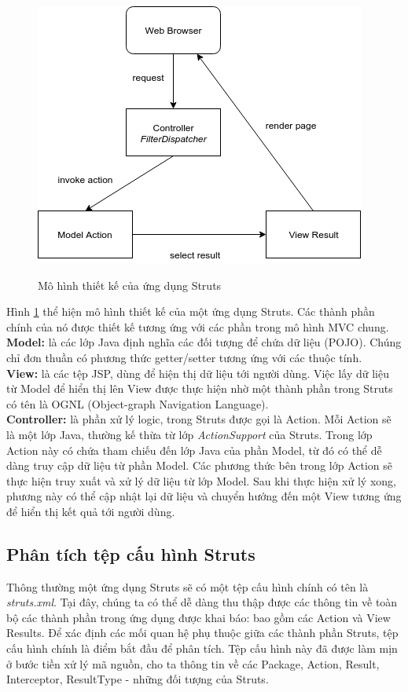 \documentclass[12pt,a4paper]{report}
\begin{document}
\begin{figure}[h]
	\centering
	\includegraphics[scale=0.8]{struts-architecture}
	\label{fig:struts-architecture}
	\caption{Mô hình thiết kế của ứng dụng Struts}
\end{figure}

Hình \ref{fig:struts-architecture} thể hiện mô hình thiết kế của một ứng dụng Struts. Các thành phần chính của nó được thiết kế tương ứng với các phần trong mô hình MVC chung.\\

\textbf{Model:} là các lớp Java định nghĩa các đối tượng để chứa dữ liệu (POJO). Chúng chỉ đơn thuần có phương thức getter/setter tương ứng với các thuộc tính.\\

\textbf{View:} là các tệp JSP, dùng để hiện thị dữ liệu tới người dùng. Việc lấy dữ liệu từ Model để hiển thị lên View được thực hiện nhờ một thành phần trong Struts có tên là OGNL (Object-graph Navigation Language).\\

\textbf{Controller:} là phần xử lý logic, trong Struts được gọi là Action. Mỗi Action sẽ là một lớp Java, thường kế thừa từ lớp \textit{ActionSupport} của Struts. Trong lớp Action này có chứa tham chiếu đến lớp Java của phần Model, từ đó có thể dễ dàng truy cập dữ liệu từ phần Model. Các phương thức bên trong lớp Action sẽ thực hiện truy xuất và xử lý dữ liệu từ lớp Model. Sau khi thực hiện xử lý xong, phương này có thể cập nhật lại dữ liệu và chuyển hướng đến một View tương ứng để hiển thị kết quả tới người dùng.\\

\subsection{Phân tích tệp cấu hình Struts}
Thông thường một ứng dụng Struts sẽ có một tệp cấu hình chính có tên là \textit{struts.xml}. Tại đây, chúng ta có thể dễ dàng thu thập được các thông tin về toàn bộ các thành phần trong ứng dụng được khai báo: bao gồm các Action và View Results. Để xác định các mối quan hệ phụ thuộc giữa các thành phần Struts, tệp cấu hình chính là điểm bắt đầu để phân tích. Tệp cấu hình này đã được làm mịn ở bước tiền xử lý mã nguồn, cho ta thông tin về các Package, Action, Result, Interceptor, ResultType - những đối tượng của Struts.
\end{document}
